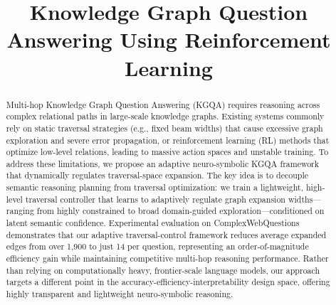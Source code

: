 \documentclass[10pt,conference]{IEEEtran}
\begin{document}

\title{Knowledge Graph Question Answering Using Reinforcement Learning}

\author{
\and
{}
}

\maketitle


\begin{abstract}


Multi-hop Knowledge Graph Question Answering (KGQA) requires reasoning across complex relational paths in large-scale knowledge graphs. Existing systems commonly rely on static traversal strategies (e.g., fixed beam widths) that cause excessive graph exploration and severe error propagation, or reinforcement learning (RL) methods that optimize low-level relations, leading to massive action spaces and unstable training. To address these limitations, we propose an adaptive neuro-symbolic KGQA framework that dynamically regulates traversal-space expansion. The key idea is to decouple semantic reasoning planning from traversal optimization: we train a lightweight, high-level traversal controller that learns to adaptively regulate graph expansion widths—ranging from highly constrained to broad domain-guided exploration—conditioned on latent semantic confidence. Experimental evaluation on ComplexWebQuestions demonstrates that our adaptive traversal-control framework reduces average expanded edges from over 1,900 to just 14 per question, representing an order-of-magnitude efficiency gain while maintaining competitive multi-hop reasoning performance. Rather than relying on computationally heavy, frontier-scale language models, our approach targets a different point in the accuracy-efficiency-interpretability design space, offering highly transparent and lightweight neuro-symbolic reasoning.

\end{abstract}
\end{document}
